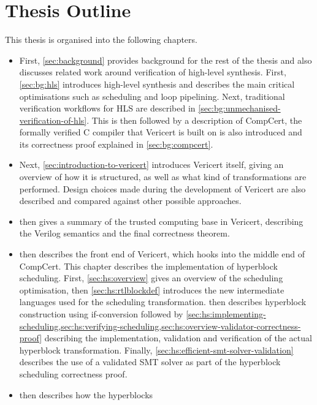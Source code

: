 \section{Thesis Outline}

This thesis is organised into the following chapters.

\begin{itemize}
\item First, \cref{sec:background} provides background for the rest of the
  thesis and also discusses related work around verification of high-level
  synthesis.  First, \cref{sec:bg:hls} introduces high-level synthesis and
  describes the main critical optimisations such as scheduling and loop
  pipelining. Next, traditional verification workflows for \gls{HLS} are
  described in \cref{sec:bg:unmechanised-verification-of-hls}. This is then
  followed by a description of CompCert, the formally verified C compiler that
  Vericert is built on is also introduced and its correctness proof explained in
  \cref{sec:bg:compcert}.
\item Next, \cref{sec:introduction-to-vericert} introduces Vericert itself,
  giving an overview of how it is structured, as well as what kind of
  transformations are performed.  Design choices made during the development of
  Vericert are also described and compared against other possible approaches.
\item {} then gives a summary of the trusted
  computing base in Vericert, describing the Verilog semantics and the final
  correctness theorem.
\item {} then describes the front end of Vericert,
  which hooks into the middle end of CompCert.  This chapter describes the
  implementation of hyperblock scheduling.  First, \cref{sec:hs:overview} gives
  an overview of the scheduling optimisation, then \cref{sec:hs:rtlblockdef}
  introduces the new intermediate languages used for the scheduling
  transformation.   then describes hyperblock
  construction using if-conversion followed by
  \cref{sec:hs:implementing-scheduling,sec:hs:verifying-scheduling,sec:hs:overview-validator-correctness-proof}
  describing the implementation, validation and verification of the actual
  hyperblock transformation.  Finally,
  \cref{sec:hs:efficient-smt-solver-validation} describes the use of a validated
  SMT solver as part of the hyperblock scheduling correctness proof.
\item {} then describes how the hyperblocks

\end{itemize}
